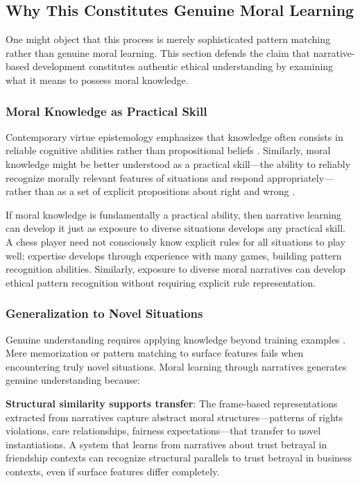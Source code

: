 \documentclass[12pt]{article}
\begin{document}
\subsection{Why This Constitutes Genuine Moral Learning}

One might object that this process is merely sophisticated pattern matching rather than genuine moral learning. This section defends the claim that narrative-based development constitutes authentic ethical understanding by examining what it means to possess moral knowledge.

\subsubsection{Moral Knowledge as Practical Skill}

Contemporary virtue epistemology emphasizes that knowledge often consists in reliable cognitive abilities rather than propositional beliefs \citep{sosa2007apt, greco2010achievements}. Similarly, moral knowledge might be better understood as a practical skill—the ability to reliably recognize morally relevant features of situations and respond appropriately—rather than as a set of explicit propositions about right and wrong \citep{dreyfus2000could, ryle1949concept}.

If moral knowledge is fundamentally a practical ability, then narrative learning can develop it just as exposure to diverse situations develops any practical skill. A chess player need not consciously know explicit rules for all situations to play well; expertise develops through experience with many games, building pattern recognition abilities. Similarly, exposure to diverse moral narratives can develop ethical pattern recognition without requiring explicit rule representation.

\subsubsection{Generalization to Novel Situations}

Genuine understanding requires applying knowledge beyond training examples \citep{mitchell2021debate}. Mere memorization or pattern matching to surface features fails when encountering truly novel situations. Moral learning through narratives generates genuine understanding because:

\textbf{Structural similarity supports transfer}: The frame-based representations extracted from narratives capture abstract moral structures—patterns of rights violations, care relationships, fairness expectations—that transfer to novel instantiations. A system that learns from narratives about trust betrayal in friendship contexts can recognize structural parallels to trust betrayal in business contexts, even if surface features differ completely.
\end{document}
